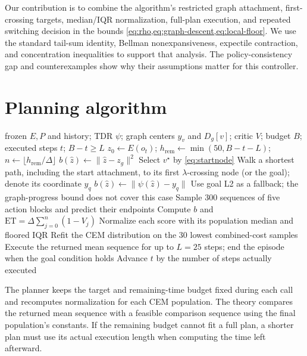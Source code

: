 \documentclass{article}
\newcommand{\ET}{\mathrm{ET}}
\newcommand{\dd}{d_{\psi}}
\theoremstyle{definition}
\theoremstyle{remark}
\begin{document}
Our contribution is to combine the algorithm's restricted graph attachment,
first-crossing targets, median/IQR normalization, full-plan execution, and repeated
switching decision in the bounds \cref{eq:rho,eq:graph-descent,eq:local-floor}.
We use the standard tail-sum identity, Bellman nonexpansiveness, expectile contraction,
and concentration inequalities to support that analysis. The policy-consistency gap
and counterexamples show why their assumptions matter for this controller.
\label{app:theory-end}
\section{Planning algorithm}
\label{app:algorithm}
\begin{algorithm}[h]
\caption{One full planning call of graph-guided latent MPC}
\label{alg:main}
\begin{algorithmic}[1]
\REQUIRE frozen $E,P$ and history; TDR $\psi$; graph centers $y_v$ and $D_g[v]$;
critic $V$; budget $B$; executed steps $t$; $B-t\ge L$
\STATE $z_0\gets E(o_t)$; $h_{\mathrm{rem}}\gets\min(50,B-t-L)$;
$n\gets\lfloor h_{\mathrm{rem}}/\Delta\rfloor$
\IF{$\dd(z_0,z_g)\le\lambda$}
 \STATE $b(\hat z)\gets\|\hat z-z_g\|^2$
 \STATE Select $v^\star$ by \cref{eq:startnode}
 \STATE Walk a shortest path, including the start attachment, to its first
 $\lambda$-crossing node (or the goal); denote its coordinate $y_q$
 \STATE $b(\hat z)\gets\|\psi(\hat z)-y_q\|$
\ELSE
 \STATE Use goal L2 as a fallback; the graph-progress bound does not cover this case
\ENDIF
{}
 \STATE Sample 300 sequences of five action blocks and predict their endpoints
 \STATE Compute $b$ and $\ET=\Delta\sum_{j=0}^{n}(1-V_j)$
 \STATE Normalize each score with its population median and floored IQR
 \STATE Refit the CEM distribution on the 30 lowest combined-cost samples
\ENDFOR
\STATE Execute the returned mean sequence for up to $L=25$ steps; end the episode when the goal condition holds
\STATE Advance $t$ by the number of steps actually executed
\end{algorithmic}
\end{algorithm}
The planner keeps the target and remaining-time budget fixed during each call and
recomputes normalization for each CEM population. The theory compares the returned
mean sequence with a feasible comparison sequence using the final population's constants.
If the remaining budget cannot fit a full plan, a shorter plan must use its actual
execution length when computing the time left afterward.
\end{document}
